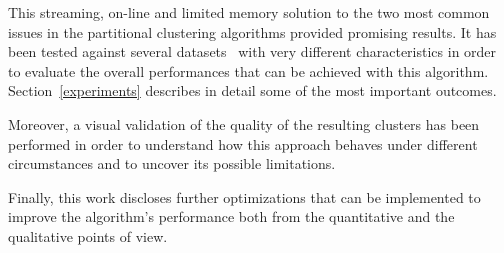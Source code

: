 This streaming, on-line and limited memory solution to the two most common 
issues in the partitional clustering algorithms provided promising results.
It has been tested against several datasets~\cite{ClusteringDatasets} with 
very different characteristics in order to evaluate the overall performances that 
can be achieved with this algorithm.
Section~\ref{experiments} describes in detail some of the most important outcomes.

Moreover, a visual validation of the quality of the resulting clusters has 
been performed in order to understand how this approach behaves under different
circumstances and to uncover its possible limitations.

Finally, this work discloses further optimizations that can be implemented to
improve the algorithm's performance both from the quantitative and the qualitative
points of view.
